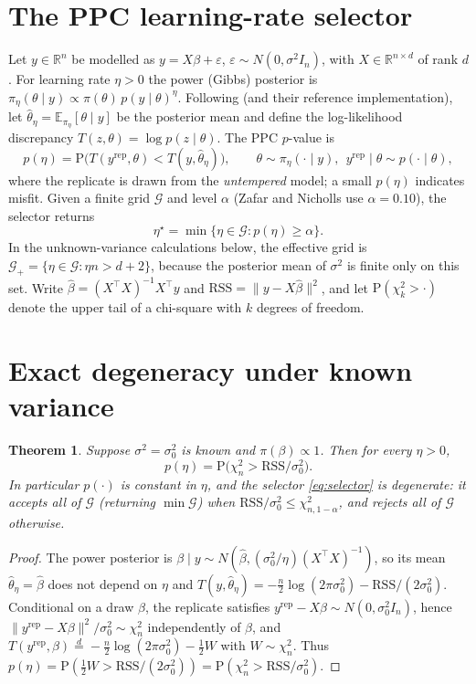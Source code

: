\documentclass[11pt]{article}
\newtheorem{theorem}{Theorem}
\theoremstyle{remark}
\newcommand{\RSS}{\mathrm{RSS}}
\newcommand{\E}{\mathbb{E}}
\newcommand{\R}{\mathbb{R}}
\newcommand{\Prob}{\mathrm{P}}
\newcommand{\bbeta}{\beta}
\newcommand{\bhat}{\hat{\bbeta}}
\newcommand{\chisq}{\chi^2}
\begin{document}
\section{The PPC learning-rate selector}
Let $y\in\R^n$ be modelled as $y=X\bbeta+\varepsilon$, $\varepsilon\sim N(0,\sigma^2 I_n)$, with
$X\in\R^{n\times d}$ of rank $d$. For learning rate $\eta>0$ the power (Gibbs) posterior is
$\pi_\eta(\theta\mid y)\propto \pi(\theta)\,p(y\mid\theta)^{\eta}$. Following \citet{zafar2024} (and their
reference implementation), let $\hat\theta_\eta=\E_{\pi_\eta}[\theta\mid y]$ be the posterior mean and define the
log-likelihood discrepancy $T(z,\theta)=\log p(z\mid\theta)$. The PPC $p$-value is
\begin{equation}\label{eq:ppc}
p(\eta)=\Prob\big(T(y^{\mathrm{rep}},\theta) < T(y,\hat\theta_\eta)\big),
\qquad \theta\sim\pi_\eta(\cdot\mid y),\ \ y^{\mathrm{rep}}\mid\theta\sim p(\cdot\mid\theta),
\end{equation}
where the replicate is drawn from the \emph{untempered} model; a small $p(\eta)$ indicates misfit. Given a finite
grid $\mathcal{G}$ and level $\alpha$ (Zafar and Nicholls use $\alpha=0.10$), the selector returns
\begin{equation}\label{eq:selector}
\eta^\star=\min\{\eta\in\mathcal G: p(\eta)\ge\alpha\}.
\end{equation}
In the unknown-variance calculations below, the effective grid is
$\mathcal G_+=\{\eta\in\mathcal G:\eta n>d+2\}$, because the posterior mean of $\sigma^2$ is finite only on this
set.
Write $\bhat=(X^\top X)^{-1}X^\top y$ and $\RSS=\lVert y-X\bhat\rVert^2$, and let $\Prob(\chisq_k>\cdot)$ denote
the upper tail of a chi-square with $k$ degrees of freedom.

\section{Exact degeneracy under known variance}
\begin{theorem}\label{thm:known}
Suppose $\sigma^2=\sigma_0^2$ is known and $\pi(\bbeta)\propto 1$. Then for every $\eta>0$,
\[
p(\eta)=\Prob\!\big(\chisq_n > \RSS/\sigma_0^2\big).
\]
In particular $p(\cdot)$ is constant in $\eta$, and the selector \eqref{eq:selector} is degenerate: it accepts
all of $\mathcal G$ (returning $\min\mathcal G$) when $\RSS/\sigma_0^2\le \chisq_{n,1-\alpha}$, and rejects all of
$\mathcal G$ otherwise.
\end{theorem}
\begin{proof}
The power posterior is $\bbeta\mid y\sim N(\bhat,(\sigma_0^2/\eta)(X^\top X)^{-1})$, so its mean
$\hat\theta_\eta=\bhat$ does not depend on $\eta$ and
$T(y,\hat\theta_\eta)=-\tfrac n2\log(2\pi\sigma_0^2)-\RSS/(2\sigma_0^2)$. Conditional on a draw $\bbeta$, the
replicate satisfies $y^{\mathrm{rep}}-X\bbeta\sim N(0,\sigma_0^2 I_n)$, hence
$\lVert y^{\mathrm{rep}}-X\bbeta\rVert^2/\sigma_0^2\sim\chisq_n$ independently of $\bbeta$, and
$T(y^{\mathrm{rep}},\bbeta)\stackrel{d}{=}-\tfrac n2\log(2\pi\sigma_0^2)-\tfrac12 W$ with $W\sim\chisq_n$. Thus
$p(\eta)=\Prob(\tfrac12 W>\RSS/(2\sigma_0^2))=\Prob(\chisq_n>\RSS/\sigma_0^2)$.
\end{proof}
\end{document}
